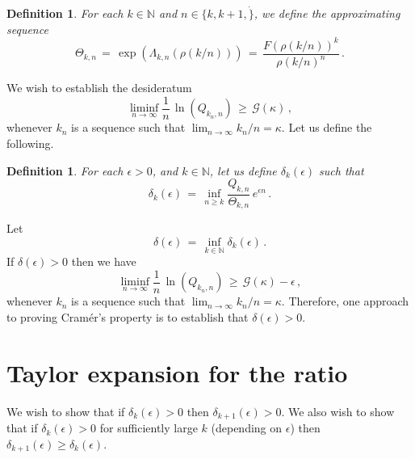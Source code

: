 \documentclass[12pt]{article}
\newtheorem{definition}[thm]{Definition}
\newcommand{\N}{\mathbb{N}}
\begin{document}
\begin{definition}
For each $k \in \N$ and $n \in \{k,k+1,\dot\}$, we define the approximating sequence
$$
\Theta_{k,n}\, =\, \exp(\Lambda_{k,n}(\rho(k/n)))\, =\, \frac{F(\rho(k/n))^k}{\rho(k/n)^n}\, .
$$
\end{definition}

We wish to establish the desideratum
\begin{equation}
\liminf_{n \to \infty} \frac{1}{n}\, \ln\left(Q_{k_n,n}\right)\, \geq\, \mathcal{G}(\kappa)\, ,
\end{equation}
whenever $k_n$ is a sequence such that $\lim_{n \to \infty} k_n/n = \kappa$.
Let us define the following.
\begin{definition}
For each $\epsilon>0$, and $k \in \N$, let us define $\delta_k(\epsilon)$ such that
$$
\delta_k(\epsilon)\, =\, \inf_{n\geq k} \frac{Q_{k,n}}{\Theta_{k,n}}\, e^{\epsilon n }\, .
$$
\end{definition}
Let
$$
\delta(\epsilon)\, =\, \inf_{k \in \N} \delta_k(\epsilon)\, .
$$
If $\delta(\epsilon)>0$ then we have
$$
\liminf_{n \to \infty} \frac{1}{n}\, \ln\left(Q_{k_n,n}\right)\, \geq\, \mathcal{G}(\kappa)-\epsilon\, ,
$$
whenever $k_n$ is a sequence such that $\lim_{n \to \infty} k_n/n = \kappa$.
Therefore, one approach to proving Cram\'er's property is to establish that $\delta(\epsilon)>0$.

\section{Taylor expansion for the ratio}

We wish to show that if $\delta_k(\epsilon)>0$ then $\delta_{k+1}(\epsilon)>0$.
We also wish to show that if $\delta_k(\epsilon)>0$ for sufficiently large $k$ (depending on $\epsilon$) then $\delta_{k+1}(\epsilon)\geq \delta_k(\epsilon)$.
\end{document}
